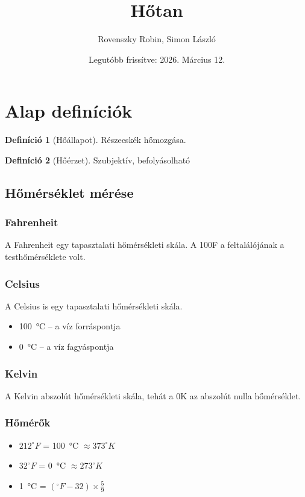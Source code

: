 \documentclass{article}
\title{Hőtan}
\author{Rovenszky Robin, Simon László}
\date{Legutóbb frissítve: 2026. Március 12.}
\theoremstyle{definition}
\newtheorem{definition}{Definíció}
\begin{document}
\maketitle
\tableofcontents
\newpage

\section{Alap definíciók}
\begin{definition}[Hőállapot]
    Részecskék hőmozgása.
\end{definition}

\begin{definition}[Hőérzet]
    Szubjektív, befolyásolható
\end{definition}

\subsection{Hőmérséklet mérése}

\subsubsection{Fahrenheit}
A Fahrenheit egy tapasztalati hőmérsékleti skála. A 100F a feltalálójának a testhőmérséklete volt.
\subsubsection{Celsius}
A Celsius is egy tapasztalati hőmérsékleti skála.
\begin{itemize}
    \item \SI{100}{\degreeCelsius} -- a víz forráspontja
    \item \SI{0}{\degreeCelsius} -- a víz fagyáspontja
\end{itemize}
\subsubsection{Kelvin}
A Kelvin abszolút hőmérsékleti skála, tehát a 0K az abszolút nulla hőmérséklet.
\subsubsection{Hőmérők}
\begin{itemize}
    \item $212^\circ F$ = \SI{100}{\degreeCelsius} $\approx 373^\circ K$
    \item $32^\circ F$ = \SI{0}{\degreeCelsius} $\approx 273^\circ K$
    \item \SI{1}{\degreeCelsius} = $(^\circ F-32) \times \frac{5}{9}$
\end{itemize}
\end{document}
